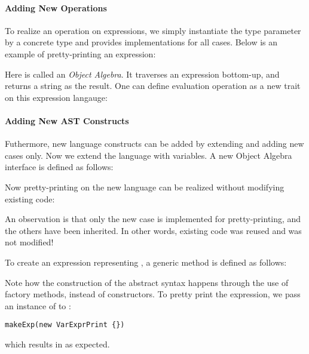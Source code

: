\paragraph{Adding New Operations}
To realize an operation on expressions, we simply instantiate the type parameter by a concrete type and
provides implementations for all cases. Below is an example of pretty-printing an expression:

Here  is called an \textit{Object Algebra}. It traverses an expression bottom-up, and returns a string as the result.
One can define evaluation operation as a new trait on this expression langauge:


\paragraph{Adding New AST Constructs}
Futhermore, new language constructs can be added by extending  and adding new cases only. Now we extend the language
with variables. A new Object Algebra interface  is defined as follows:

Now pretty-printing on the new language can be realized without modifying existing code:

An observation is that only the new case is implemented for pretty-printing, and the others have been inherited.
In other words, existing code was reused and was not modified!

To create an expression representing , a generic method is defined as follows:


Note how the construction of the abstract syntax happens through
the use of factory methods, instead of constructors.
To pretty print the expression,
we pass an instance of  to :

\begin{lstlisting}
makeExp(new VarExprPrint {})
\end{lstlisting}
which results in  as expected.

